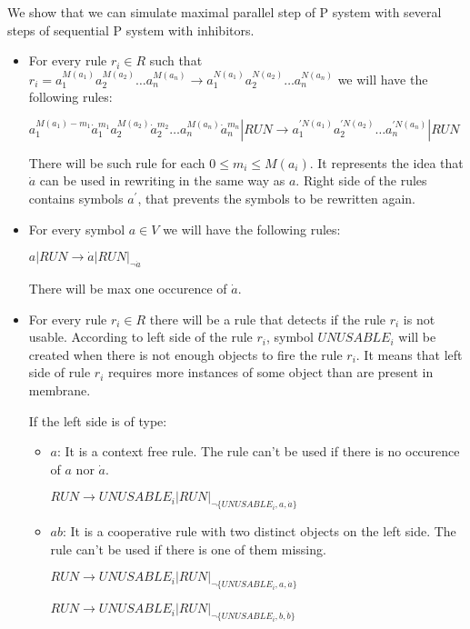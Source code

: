\documentclass[a4paper,10pt]{article}
\begin{document}
\begin{dokaz}
  We show that we can simulate maximal parallel step of P system with several steps of sequential P system with inhibitors.

  \begin{itemize}
    \item For every rule $r_i\in R$ such that $r_i = a_1^{M(a_1)}a_2^{M(a_2)}\dots a_n^{M(a_n)} \rightarrow a_1^{N(a_1)}a_2^{N(a_2)}\dots a_n^{N(a_n)}$ we will have the following rules:
  
    $a_1^{M(a_1)-m_1}\dot{a}_1^{m_1}a_2^{M(a_2)}\dot{a}_2^{m_2}\dots a_n^{M(a_n)}\dot{a}_n^{m_n}|RUN \rightarrow a_1^{\prime N(a_1)}a_2^{\prime N(a_2)}\dots a_n^{\prime N(a_n)}|RUN$

    There will be such rule for each $0\leq m_i\leq M(a_i)$. It represents the idea that $\dot{a}$ can be used in rewriting in the same way as $a$. Right side of the rules contains symbols $a^\prime$, that prevents the symbols to be rewritten again.

    \item For every symbol $a\in V$ we will have the following rules:

    $a|RUN \rightarrow \dot{a}|RUN|_{\neg \dot{a}}$

    There will be max one occurence of $\dot{a}$.

    \item For every rule $r_i\in R$ there will be a rule that detects if the rule $r_i$ is not usable. According to left side of the rule $r_i$, symbol $UNUSABLE_i$ will be created when there is not enough objects to fire the rule $r_i$. It means that left side of rule $r_i$ requires more instances of some object than are present in membrane.

    If the left side is of type:
    \begin{itemize}
      \item $a$: It is a context free rule. The rule can't be used if there is no occurence of $a$ nor $\dot{a}$.

      $RUN \rightarrow UNUSABLE_i|RUN|_{\neg\{UNUSABLE_i, a, \dot{a}\}}$

      \item $ab$: It is a cooperative rule with two distinct objects on the left side. The rule can't be used if there is one of them missing.

      $RUN \rightarrow UNUSABLE_i|RUN|_{\neg\{UNUSABLE_i, a, \dot{a}\}}$

      $RUN \rightarrow UNUSABLE_i|RUN|_{\neg\{UNUSABLE_i, b, \dot{b}\}}$


\end{itemize}
\end{itemize}
\end{dokaz}
\end{document}
